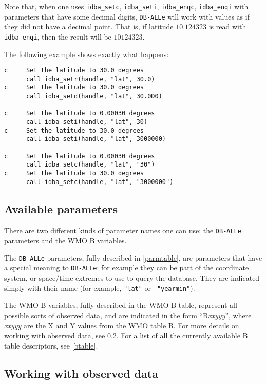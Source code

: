 \documentclass[draft,12pt,a4paper,twoside]{book}
\newcommand{\dballe}{{\tt DB-ALLe}}
\begin{document}
Note that, when one uses {\tt idba\_setc}, {\tt idba\_seti}, {\tt idba\_enqc},
{\tt idba\_enqi} with parameters that have some decimal digits, \dballe{} will
work with values as if they did not have a decimal point.  That is, if latitude
$10.124323$ is read with {\tt idba\_enqi}, then the result will be $10124323$.

The following example shows exactly what happens:

\begin{verbatim}
c     Set the latitude to 30.0 degrees
      call idba_setr(handle, "lat", 30.0)
c     Set the latitude to 30.0 degrees
      call idba_setd(handle, "lat", 30.0D0)

c     Set the latitude to 0.00030 degrees
      call idba_seti(handle, "lat", 30)
c     Set the latitude to 30.0 degrees
      call idba_seti(handle, "lat", 3000000)

c     Set the latitude to 0.00030 degrees
      call idba_setc(handle, "lat", "30")
c     Set the latitude to 30.0 degrees
      call idba_setc(handle, "lat", "3000000")
\end{verbatim}

\subsection {Available parameters}

There are two different kinds of parameter names one can use: the \dballe{}
parameters and the WMO B variables.

The \dballe{} parameters, fully described in \ref{parmtable}, are parameters
that have a special meaning to \dballe{}: for example they can be part of the
coordinate system, or space/time extremes to use to query the database.  They
are indicated simply with their name (for example, {\tt "lat"} or {\tt
"yearmin"}).

The WMO B variables, fully described in the WMO B table, represent all possible
sorts of observed data, and are indicated in the form ``B{\itshape xxyyy}'',
where {\itshape xxyyy} are the X and Y values from the WMO table B.  For more
details on working with observed data, see \ref{obsdata}.  For a list of all
the currently available B table descriptors, see \ref{btable}.


\subsection{Working with observed data}
\label{obsdata}
\end{document}
